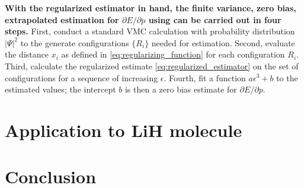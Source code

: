\documentclass{article}
\begin{document}
\textbf{With the regularized estimator in hand, the finite variance, zero bias, extrapolated estimation for $\partial E/\partial p$ using can be carried out in four steps.}
First, conduct a standard VMC calculation with probability distribution $|\Psi|^2$ to the generate configurations $\{R_i\}$ needed for estimation.
Second, evaluate the distance $x_i$ as defined in \eqref{eq:regularizing_function} for each configuration $R_i$.
Third, calculate the regularized estimate \eqref{eq:regularized_estimator} on the set of configurations for a sequence of increasing $\epsilon$.
Fourth, fit a function $a\epsilon^3 + b$ to the estimated values; the intercept $b$ is then a zero bias estimate for $\partial E/\partial p.$

\section{Application to LiH molecule}
\section{Conclusion}


\end{document}
